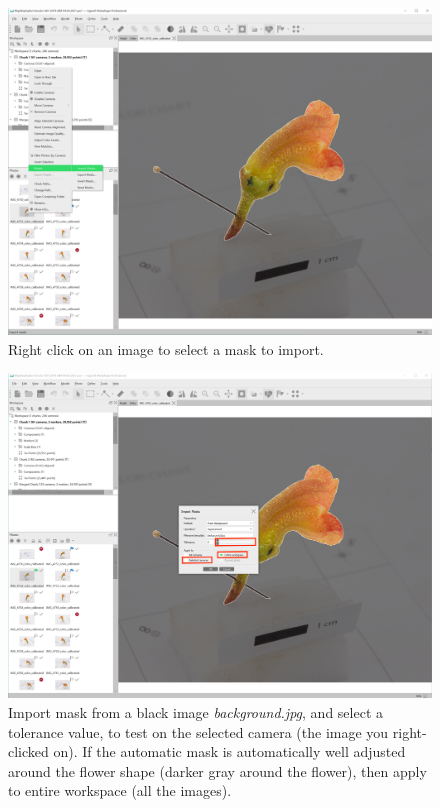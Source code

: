 \documentclass[
]{book}
\begin{document}
\begin{figure}
\centering
\includegraphics[width=1\textwidth,height=\textheight]{Figures/Metashape_mask_right_click.png}
\caption{Right click on an image to select a mask to
import.}
\end{figure}

\begin{figure}
\centering
\includegraphics[width=1\textwidth,height=\textheight]{Figures/Metashape_masks_tolerance.png}
\caption{Import mask from a black image \emph{background.jpg}, and select a
tolerance value, to test on the selected camera (the image you
right-clicked on). If the automatic mask is automatically well adjusted
around the flower shape (darker gray around the flower), then apply to
entire workspace (all the
images).}
\end{figure}
\end{document}
